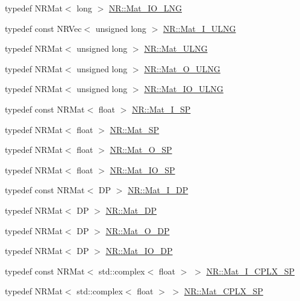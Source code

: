 \begin{DoxyCompactItemize}
typedef N\+R\+Mat$<$ long $>$ \mbox{\hyperlink{namespaceNR_abb2210688d9255481fd052afcacb022a}{N\+R\+::\+Mat\+\_\+\+I\+O\+\_\+\+L\+NG}}
\item 
typedef const N\+R\+Vec$<$ unsigned long $>$ \mbox{\hyperlink{namespaceNR_ab203ca7a3abe14655f8d67302282a7d8}{N\+R\+::\+Mat\+\_\+\+I\+\_\+\+U\+L\+NG}}
\item 
typedef N\+R\+Mat$<$ unsigned long $>$ \mbox{\hyperlink{namespaceNR_a6eba03f3bb664e5dd9de82a8d03beb66}{N\+R\+::\+Mat\+\_\+\+U\+L\+NG}}
\item 
typedef N\+R\+Mat$<$ unsigned long $>$ \mbox{\hyperlink{namespaceNR_ac6e0098423dff001af25e38b4ee35ecf}{N\+R\+::\+Mat\+\_\+\+O\+\_\+\+U\+L\+NG}}
\item 
typedef N\+R\+Mat$<$ unsigned long $>$ \mbox{\hyperlink{namespaceNR_ad39bb0df7e57ea005a5334cc659f5743}{N\+R\+::\+Mat\+\_\+\+I\+O\+\_\+\+U\+L\+NG}}
\item 
typedef const N\+R\+Mat$<$ float $>$ \mbox{\hyperlink{namespaceNR_a061a8b183608807da47c75755802abfd}{N\+R\+::\+Mat\+\_\+\+I\+\_\+\+SP}}
\item 
typedef N\+R\+Mat$<$ float $>$ \mbox{\hyperlink{namespaceNR_aa22c72001d6a0e18146f41e98b9a33af}{N\+R\+::\+Mat\+\_\+\+SP}}
\item 
typedef N\+R\+Mat$<$ float $>$ \mbox{\hyperlink{namespaceNR_a1f43923ad3dc2cee2dc76f0af4dc1ad3}{N\+R\+::\+Mat\+\_\+\+O\+\_\+\+SP}}
\item 
typedef N\+R\+Mat$<$ float $>$ \mbox{\hyperlink{namespaceNR_a1003f2aa49b4cba93bf437a81133c9f4}{N\+R\+::\+Mat\+\_\+\+I\+O\+\_\+\+SP}}
\item 
typedef const N\+R\+Mat$<$ DP $>$ \mbox{\hyperlink{namespaceNR_a2b8abfda8fffad6ba0a1b5a4c0773dbf}{N\+R\+::\+Mat\+\_\+\+I\+\_\+\+DP}}
\item 
typedef N\+R\+Mat$<$ DP $>$ \mbox{\hyperlink{namespaceNR_afeedcf8f11ce39a2c83aefe0253cbbda}{N\+R\+::\+Mat\+\_\+\+DP}}
\item 
typedef N\+R\+Mat$<$ DP $>$ \mbox{\hyperlink{namespaceNR_adc1f8da33094b6bbeb1f5f899515ce54}{N\+R\+::\+Mat\+\_\+\+O\+\_\+\+DP}}
\item 
typedef N\+R\+Mat$<$ DP $>$ \mbox{\hyperlink{namespaceNR_ad1513aa4697878ed3bff0b8b3c9dd910}{N\+R\+::\+Mat\+\_\+\+I\+O\+\_\+\+DP}}
\item 
typedef const N\+R\+Mat$<$ std\+::complex$<$ float $>$ $>$ \mbox{\hyperlink{namespaceNR_a0ef9291e459694a91295db095287e78b}{N\+R\+::\+Mat\+\_\+\+I\+\_\+\+C\+P\+L\+X\+\_\+\+SP}}
\item 
typedef N\+R\+Mat$<$ std\+::complex$<$ float $>$ $>$ \mbox{\hyperlink{namespaceNR_accbf3fece80df76410b863e2cb7d2567}{N\+R\+::\+Mat\+\_\+\+C\+P\+L\+X\+\_\+\+SP}}

\end{DoxyCompactItemize}
